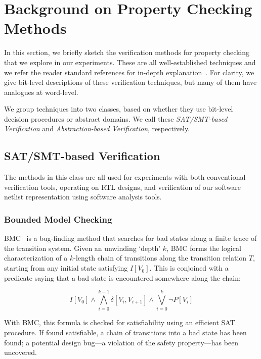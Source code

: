\section{Background on Property Checking Methods}\label{sec:background}

In this section, we briefly sketch the verification methods for property checking that
we explore in our experiments. These are all well-established techniques and we refer 
the reader standard references for in-depth explanation~\cite{mc,hbmc}.
For clarity, we give bit-level descriptions of these verification techniques, but
many of them have analogues at word-level.

We group techniques into two classes, based on whether they use bit-level decision procedures 
or abstract domains. We call these \textit{SAT/SMT-based Verification} and 
\textit{Abstraction-based Verification}, respectively.

\subsection{SAT/SMT-based Verification}

The methods in this class are all used for experiments with both conventional verification tools,
operating on RTL designs, and verification of  our software netlist representation using software analysis tools.

\subsubsection{Bounded Model Checking} 

BMC~\cite{biere} is a bug-finding method that searches for bad states along a finite trace of 
the transition system. 
Given an unwinding `depth' $k$, BMC forms the logical characterization of a 
$k$-length chain of transitions along the transition relation $T$,  starting 
from any initial state satisfying $I[V_0]$. This is conjoined with a predicate saying that a bad state is encountered somewhere along the chain:

\begin{equation}\label{bmc-formula}
I[V_0] \wedge \bigwedge_{i{=}0}^{k{-}1}\delta[V_i, V_{i+1}] \wedge \bigvee_{i{=}0}^{k} \neg P[V_i]
\end{equation}

With BMC, this formula is checked for satisfiability using an efficient SAT procedure.
If found satisfiable, a chain of transitions into a bad state has been found;
a potential design bug---a violation of the safety property---has been uncovered.

